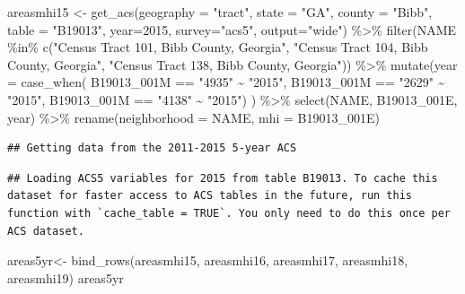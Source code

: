 \documentclass[
]{article}
\newenvironment{Shaded}{\begin{snugshade}}{\end{snugshade}}
\newcommand{\AttributeTok}[1]{\textcolor[rgb]{0.77,0.63,0.00}{#1}}
\newcommand{\DecValTok}[1]{\textcolor[rgb]{0.00,0.00,0.81}{#1}}
\newcommand{\FunctionTok}[1]{\textcolor[rgb]{0.00,0.00,0.00}{#1}}
\newcommand{\NormalTok}[1]{#1}
\newcommand{\OtherTok}[1]{\textcolor[rgb]{0.56,0.35,0.01}{#1}}
\newcommand{\SpecialCharTok}[1]{\textcolor[rgb]{0.00,0.00,0.00}{#1}}
\newcommand{\StringTok}[1]{\textcolor[rgb]{0.31,0.60,0.02}{#1}}
\begin{document}
\begin{Shaded}
\begin{Highlighting}[]
\NormalTok{areasmhi15 }\OtherTok{\textless{}{-}} \FunctionTok{get\_acs}\NormalTok{(}\AttributeTok{geography =} \StringTok{"tract"}\NormalTok{, }\AttributeTok{state =} \StringTok{"GA"}\NormalTok{, }\AttributeTok{county =} \StringTok{"Bibb"}\NormalTok{, }\AttributeTok{table =} \StringTok{"B19013"}\NormalTok{, }\AttributeTok{year=}\DecValTok{2015}\NormalTok{, }\AttributeTok{survey=}\StringTok{"acs5"}\NormalTok{, }\AttributeTok{output=}\StringTok{"wide"}\NormalTok{) }\SpecialCharTok{\%\textgreater{}\%}
\FunctionTok{filter}\NormalTok{(NAME }\SpecialCharTok{\%in\%} \FunctionTok{c}\NormalTok{(}\StringTok{"Census Tract 101, Bibb County, Georgia"}\NormalTok{, }\StringTok{"Census Tract 104, Bibb County, Georgia"}\NormalTok{, }\StringTok{"Census Tract 138, Bibb County, Georgia"}\NormalTok{)) }\SpecialCharTok{\%\textgreater{}\%}
\FunctionTok{mutate}\NormalTok{(}\AttributeTok{year =} \FunctionTok{case\_when}\NormalTok{(}
\NormalTok{  B19013\_001M }\SpecialCharTok{==} \StringTok{"4935"} \SpecialCharTok{\textasciitilde{}} \StringTok{"2015"}\NormalTok{,}
\NormalTok{  B19013\_001M }\SpecialCharTok{==} \StringTok{"2629"} \SpecialCharTok{\textasciitilde{}} \StringTok{"2015"}\NormalTok{,}
\NormalTok{  B19013\_001M }\SpecialCharTok{==} \StringTok{"4138"} \SpecialCharTok{\textasciitilde{}} \StringTok{"2015"}\NormalTok{) ) }\SpecialCharTok{\%\textgreater{}\%}
\FunctionTok{select}\NormalTok{(NAME, B19013\_001E, year) }\SpecialCharTok{\%\textgreater{}\%}
\FunctionTok{rename}\NormalTok{(}\AttributeTok{neighborhood =}\NormalTok{ NAME, }\AttributeTok{mhi =}\NormalTok{ B19013\_001E) }
\end{Highlighting}
\end{Shaded}

\begin{verbatim}
## Getting data from the 2011-2015 5-year ACS
\end{verbatim}

\begin{verbatim}
## Loading ACS5 variables for 2015 from table B19013. To cache this dataset for faster access to ACS tables in the future, run this function with `cache_table = TRUE`. You only need to do this once per ACS dataset.
\end{verbatim}

\begin{Shaded}
\begin{Highlighting}[]
\NormalTok{areas5yr}\OtherTok{\textless{}{-}} \FunctionTok{bind\_rows}\NormalTok{(areasmhi15, areasmhi16, areasmhi17, areasmhi18, areasmhi19) }
\NormalTok{areas5yr}
\end{Highlighting}
\end{Shaded}
\end{document}
